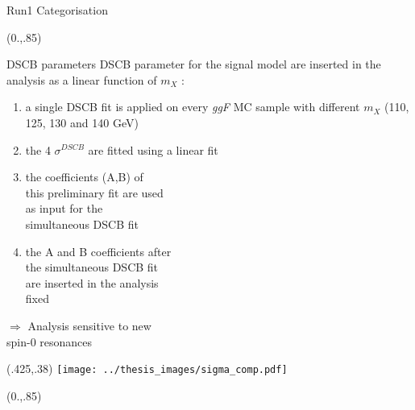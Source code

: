 \documentclass[10pt,UKenglish, leqno, xcolor = dvipsnames]{beamer}
\begin{document}
\begin{frame}{Run1 Categorisation}
			\begin{textblock}{1}(0.,.85)
				\begin{figure}
				\end{figure}
			\end{textblock}
		\end{frame}
		
		\begin{frame}{DSCB parameters}
			\vspace{.2cm}
			DSCB parameter for the signal model are inserted in the analysis as a linear function of $m_X$ :
			\begin{enumerate}
				\item a single DSCB fit is applied on every \textit{ggF} MC sample with different $m_X$ (110, 125, 130 and 140 GeV)
				\item the 4 $\sigma^{DSCB}$ are fitted using a linear fit
				\item the coefficients (A,B) of\\ this preliminary fit are used\\ as input for the \\simultaneous DSCB fit
				\item the A and B coefficients after\\ the simultaneous DSCB fit\\ are inserted in the analysis\\ fixed
			\end{enumerate}
			$\Rightarrow$ Analysis sensitive to new\\ spin-0 resonances
			\begin{textblock}{1}(.425,.38)
				\texttt{[image: ../thesis\_images/sigma\_comp.pdf]}
			\end{textblock}
			\begin{textblock}{1}(0.,.85)
				\begin{figure}
				\end{figure}
			\end{textblock}
		\end{frame}
		
\end{document}
